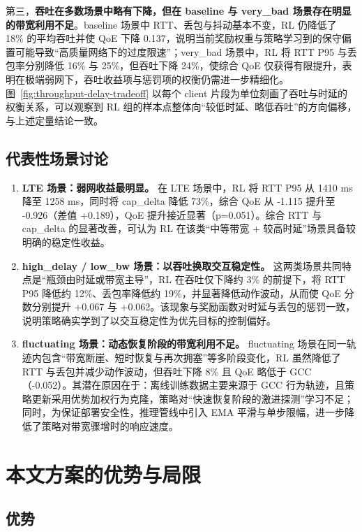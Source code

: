 第三，\textbf{吞吐在多数场景中略有下降，但在 baseline 与 very\_bad 场景存在明显的带宽利用不足}。baseline 场景中 RTT、丢包与抖动基本不变，RL 仍降低了 18\% 的平均吞吐并使 QoE 下降 0.137，说明当前奖励权重与策略学习到的保守偏置可能导致“高质量网络下的过度限速”；very\_bad 场景中，RL 将 RTT P95 与丢包率分别降低 16\% 与 25\%，但吞吐下降 24\%，使综合 QoE 仅获得有限提升，表明在极端弱网下，吞吐收益项与惩罚项的权衡仍需进一步精细化。图~\ref{fig:throughput-delay-tradeoff} 以每个 client 片段为单位刻画了吞吐与时延的权衡关系，可以观察到 RL 组的样本点整体向“较低时延、略低吞吐”的方向偏移，与上述定量结论一致。

\subsection{代表性场景讨论}

\begin{enumerate}
    \item \textbf{LTE 场景：弱网收益最明显。} 在 LTE 场景中，RL 将 RTT P95 从 1410 ms 降至 1258 ms，同时将 cap\_delta 降低 73\%，综合 QoE 从 -1.115 提升至 -0.926（差值 +0.189），QoE 提升接近显著（p=0.051）。综合 RTT 与 cap\_delta 的显著改善，可认为 RL 在该类“中等带宽 + 较高时延”场景具备较明确的稳定性收益。
    \item \textbf{high\_delay / low\_bw 场景：以吞吐换取交互稳定性。} 这两类场景共同特点是“瓶颈由时延或带宽主导”，RL 在吞吐仅下降约 3\% 的前提下，将 RTT P95 降低约 12\%、丢包率降低约 19\%，并显著降低动作波动，从而使 QoE 分数分别提升 +0.067 与 +0.062。该现象与奖励函数对时延与丢包的惩罚一致，说明策略确实学到了以交互稳定性为优先目标的控制偏好。
    \item \textbf{fluctuating 场景：动态恢复阶段的带宽利用不足。} fluctuating 场景在同一轨迹内包含“带宽断崖、短时恢复与再次拥塞”等多阶段变化，RL 虽然降低了 RTT 与丢包并减少动作波动，但吞吐下降 8\% 且 QoE 略低于 GCC（-0.052）。其潜在原因在于：离线训练数据主要来源于 GCC 行为轨迹，且策略更新采用优势加权行为克隆，策略对“快速恢复阶段的激进探测”学习不足；同时，为保证部署安全性，推理管线中引入 EMA 平滑与单步限幅，进一步降低了策略对带宽骤增时的响应速度。
\end{enumerate}

\section{本文方案的优势与局限}

\subsection{优势}

